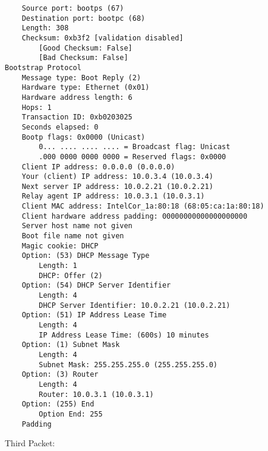 \begin{lstlisting}
    Source port: bootps (67)
    Destination port: bootpc (68)
    Length: 308
    Checksum: 0xb3f2 [validation disabled]
        [Good Checksum: False]
        [Bad Checksum: False]
Bootstrap Protocol
    Message type: Boot Reply (2)
    Hardware type: Ethernet (0x01)
    Hardware address length: 6
    Hops: 1
    Transaction ID: 0xb0203025
    Seconds elapsed: 0
    Bootp flags: 0x0000 (Unicast)
        0... .... .... .... = Broadcast flag: Unicast
        .000 0000 0000 0000 = Reserved flags: 0x0000
    Client IP address: 0.0.0.0 (0.0.0.0)
    Your (client) IP address: 10.0.3.4 (10.0.3.4)
    Next server IP address: 10.0.2.21 (10.0.2.21)
    Relay agent IP address: 10.0.3.1 (10.0.3.1)
    Client MAC address: IntelCor_1a:80:18 (68:05:ca:1a:80:18)
    Client hardware address padding: 00000000000000000000
    Server host name not given
    Boot file name not given
    Magic cookie: DHCP
    Option: (53) DHCP Message Type
        Length: 1
        DHCP: Offer (2)
    Option: (54) DHCP Server Identifier
        Length: 4
        DHCP Server Identifier: 10.0.2.21 (10.0.2.21)
    Option: (51) IP Address Lease Time
        Length: 4
        IP Address Lease Time: (600s) 10 minutes
    Option: (1) Subnet Mask
        Length: 4
        Subnet Mask: 255.255.255.0 (255.255.255.0)
    Option: (3) Router
        Length: 4
        Router: 10.0.3.1 (10.0.3.1)
    Option: (255) End
        Option End: 255
    Padding

\end{lstlisting}
Third Packet:\\

